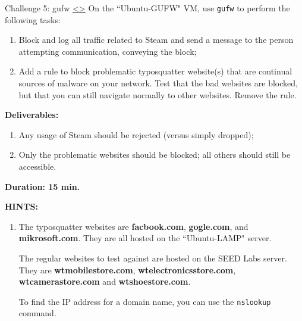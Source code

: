 \documentclass[12pt]{extarticle}
\newenvironment{instructionblock}{\Large\bgroup}{\egroup}
\newcommand{\ben}{\begin{enumerate}}
\newcommand{\een}{\end{enumerate}}
\begin{document}
\pagebreak
\begin{slide}{ Challenge 5: gufw }{ \hyperref[slide 22]{\textless}\hyperref[slide 24]{\textgreater} }
\vskip 5pt
\begin{instructionblock}
	On the ``Ubuntu-GUFW" VM, use \texttt{gufw} to perform the following tasks:
	\begin{enumerate}
	\item{ Block and log all traffic related to Steam and send a message to the person attempting communication, conveying the block; }
	\item{ Add a rule to block problematic typosquatter website(s) that are continual sources of malware on your network. Test that the bad websites are blocked, but that you can still navigate normally to other websites. Remove the rule. }
	\end{enumerate}

\end{instructionblock}

\textbf{\Large{Deliverables:}}
\ben
\item Any usage of Steam should be rejected (versus simply dropped);
\item Only the problematic websites should be blocked; all others should still be accessible. 
\een

\vspace{20mm}
\begin{center}
	\textbf{\Large{Duration: 15 min.} }
\end{center}

\end{slide}


\vspace{8mm}
\noindent
\textbf{HINTS:}
\begin{enumerate}

\item The typosquatter websites are \textbf{facbook.com}, \textbf{gogle.com}, and \textbf{mikrosoft.com}. They are all hosted on the ``Ubuntu-LAMP" server.

The regular websites to test against are hosted on the SEED Labs server. They are \textbf{wtmobilestore.com}, \textbf{wtelectronicsstore.com}, \textbf{wtcamerastore.com} and \textbf{wtshoestore.com}.

To find the IP address for a domain name, you can use the \texttt{nslookup} command.

\end{enumerate}


\end{document}
